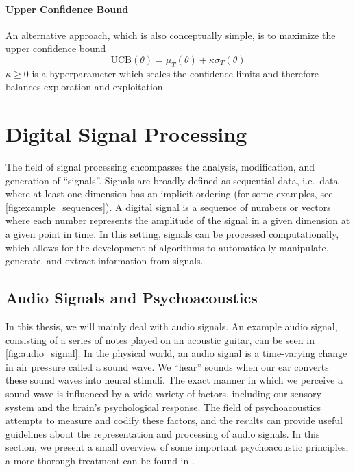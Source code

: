 \paragraph{Upper Confidence Bound}

An alternative approach, which is also conceptually simple, is to maximize the upper confidence bound
\begin{equation}
        \mathrm{UCB}(\theta) = \mu_T(\theta) + \kappa \sigma_T(\theta)
\end{equation}
$\kappa \ge 0$ is a hyperparameter which scales the confidence limits and therefore balances exploration and exploitation.

\section{Digital Signal Processing}

The field of signal processing encompasses the analysis, modification, and generation of ``signals''.
Signals are broadly defined as sequential data, i.e.\ data where at least one dimension has an implicit ordering (for some examples, see \cref{fig:example_sequences}).
A digital signal is a sequence of numbers or vectors where each number represents the amplitude of the signal in a given dimension at a given point in time.
In this setting, signals can be processed computationally, which allows for the development of algorithms to automatically manipulate, generate, and extract information from signals.

\subsection{Audio Signals and Psychoacoustics}
\label{sec:psychoacoustics}

In this thesis, we will mainly deal with audio signals.
An example audio signal, consisting of a series of notes played on an acoustic guitar, can be seen in \cref{fig:audio_signal}.
In the physical world, an audio signal is a time-varying change in air pressure called a sound wave.
We ``hear'' sounds when our ear converts these sound waves into neural stimuli.
The exact manner in which we perceive a sound wave is influenced by a wide variety of factors, including our sensory system and the brain's psychological response.
The field of psychoacoustics attempts to measure and codify these factors, and the results can provide useful guidelines about the representation and processing of audio signals.
In this section, we present a small overview of some important psychoacoustic principles; a more thorough treatment can be found in \cite{cook1999music,bosi2012introduction}.

